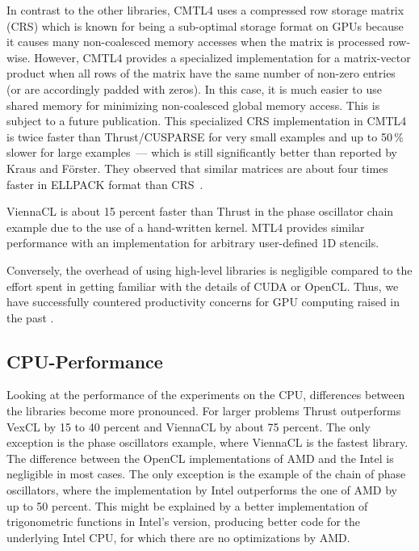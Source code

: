 \documentclass[final]{siamltex}
\begin{document}
In contrast to the other libraries, CMTL4 uses a compressed row storage matrix
(CRS) which is known for being a sub-optimal storage format on GPUs because it
causes many non-coalesced memory accesses when the matrix is processed
row-wise.  However, CMTL4 provides a specialized implementation for a
matrix-vector product when all rows of the matrix have the same number of
non-zero entries (or are accordingly padded with zeros).  In this case, it is
much easier to use shared memory for minimizing non-coalesced global memory
access.  This is subject to a future publication.
This specialized CRS implementation in CMTL4 is twice faster than
Thrust/CUSPARSE for very small examples and up to 50\,\% slower for large
examples~--- which is still significantly better than reported by Kraus and
F\"orster. They observed that similar matrices are about four times faster in
ELLPACK format than CRS~\cite{KrausFoerster}.

ViennaCL is about 15 percent faster than Thrust in the phase oscillator chain
example due to the use of a hand-written kernel.
MTL4 provides similar performance with an implementation for arbitrary user-defined
1D stencils.

Conversely, the overhead of
using high-level libraries is negligible compared to the effort spent in
getting familiar with the details of CUDA or OpenCL.  Thus, we have
successfully countered productivity concerns for GPU computing raised in the
past \cite{bordawekar:gpu-productivity}.


\subsection{CPU-Performance}
Looking at the performance of the experiments on the CPU,
differences between the libraries become more pronounced. For larger problems Thrust outperforms VexCL
by 15 to 40 percent and ViennaCL by about 75 percent. The only exception is the phase oscillators
example, where ViennaCL is the fastest library. The difference
between the OpenCL implementations of AMD and the Intel is negligible in
most cases. The only exception is the example of the chain of phase oscillators,
where the implementation by Intel outperforms the one of AMD by up to 50 percent.
This might be explained by a better implementation of trigonometric functions in Intel's version,
producing better code for the underlying Intel CPU, for which there are no optimizations by AMD.
\end{document}
